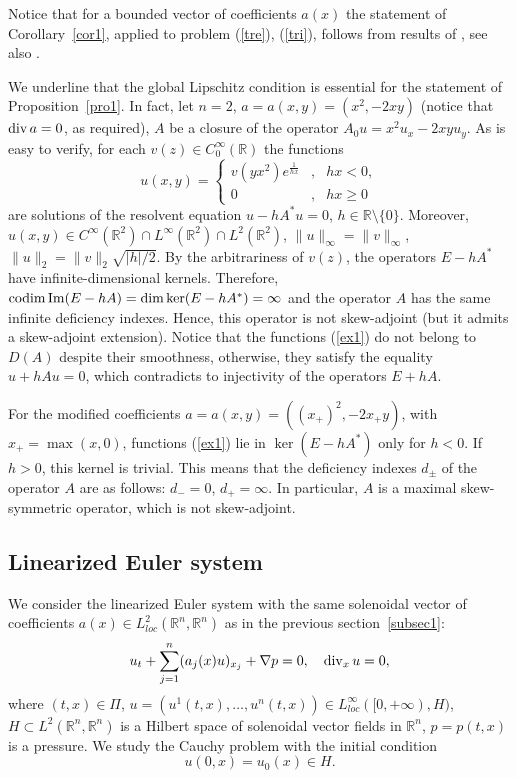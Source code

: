 \documentclass[12pt]{article}
\newcommand{\R}{{\mathbb R}}
\renewcommand{\div}{\mathop{\rm div}\nolimits}
\newcommand{\codim}{\mathop{\rm codim}}
\renewcommand{\Im}{\mathop{\rm Im}}
\numberwithin{equation}{section}
\theoremstyle{plain}
\theoremstyle{definition}
\begin{document}
Notice that for a bounded vector of coefficients $a(x)$ the statement of Corollary~\ref{cor1}, applied to problem (\ref{tre}), (\ref{tri}), follows from results of \cite{BoCr}, see also \cite{ufa,prep}.

\medskip
We underline that the global Lipschitz condition is essential for the statement of Proposition~\ref{pro1}. In fact, let 
$n=2$, $a=a(x,y)=(x^2,-2xy)$ (notice that $\div a=0$, as required), $A$ be a closure of the operator $A_0u=x^2u_x-2xyu_y$. As is easy to verify, for each $v(z)\in C_0^\infty(\R)$ the functions
\begin{equation}\label{ex1}
u(x,y)=\left\{\begin{array}{lcr} v(yx^2)e^{\frac{1}{hx}} & , & hx<0, \\ 0 & , & hx\ge 0 \end{array}\right.
\end{equation}
are solutions of the resolvent equation $u-hA^*u=0$, $h\in\R\setminus\{0\}$. Moreover, 
$u(x,y)\in C^\infty(\R^2)\cap L^\infty(\R^2)\cap L^2(\R^2)$, $\|u\|_\infty=\|v\|_\infty$, $\|u\|_2=\|v\|_2\sqrt{|h|/2}$.
By the arbitrariness of $v(z)$, the operators $E-hA^*$ have infinite-dimensional kernels. Therefore, $\codim\Im(E-hA)=\dim\ker(E-hA^*)=\infty$ and the operator $A$ has the same infinite deficiency indexes. Hence, this operator is not skew-adjoint (but it admits a skew-adjoint extension). Notice that the functions (\ref{ex1}) do not belong to $D(A)$ despite their smoothness, otherwise, they satisfy the equality $u+hAu=0$, which contradicts to injectivity of the operators $E+hA$.

For the modified coefficients $a=a(x,y)=((x_+)^2,-2x_+y)$, with $x_+=\max(x,0)$, functions
(\ref{ex1}) lie in $\ker(E-hA^*)$ only for $h<0$. If $h>0$, this kernel is trivial. This means that the deficiency indexes $d_\pm$ of the operator $A$ are as follows: $d_-=0$, $d_+=\infty$. In particular, $A$ is a maximal skew-symmetric operator, which is not skew-adjoint.





\subsection{Linearized Euler system}\label{subsec2}
We consider the linearized Euler system with the same solenoidal vector of coefficients $a(x)\in L^2_{loc}(\R^n,\R^n)$ as in the previous section~\ref{subsec1}:
\begin{equation}\label{Es}
u_t+\sum_{j=1}^n (a_j(x)u)_{x_j}+\nabla p=0, \quad \div_x u=0,
\end{equation}
where $(t,x)\in\Pi$, $u=(u^1(t,x),\ldots,u^n(t,x))\in L^\infty_{loc}([0,+\infty),H)$, $H\subset L^2(\R^n,\R^n)$ is a Hilbert space of solenoidal vector fields in $\R^n$, $p=p(t,x)$ is a pressure. We study the Cauchy problem with the initial condition
\begin{equation}\label{Esi}
u(0,x)=u_0(x)\in H.
\end{equation}
\end{document}
